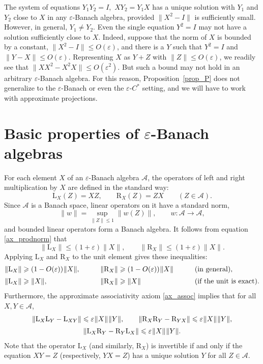 \documentclass[12pt]{article}
\newcommand{\calA}{\mathcal{A}}
\newcommand{\ts}{\mkern1mu}
\newcommand{\La}{\mathrm{L}}
\newcommand{\Ra}{\mathrm{R}}
\newcommand{\eps}{\varepsilon}
\renewcommand{\le}{\leqslant}
\renewcommand{\ge}{\geqslant}
\newtheorem[definition]{Definition}[Theorem]{Definition}
\newtheorem[remark]{Example}[Theorem]{Example}
\newtheorem[remark]{Remark}[Theorem]{Remark}
\newtheorem[remark]{Question}[Theorem]{Open question}
\newtheorem*[definition]{definition}{Definition}
\newtheorem*[remark]{example}{Example}
\newtheorem*[remark]{remark}{Remark}
\newtheorem*[remark]{question}{Open question}
\numberwithin{equation}{section}
\begin{document}
\begin{Remark}\label{rem_X2}
The system of equations $Y_1Y_2=I$,\, $XY_2=Y_1X$ has a unique solution with $Y_1$ and $Y_2$ close to $X$ in any $\eps$-Banach algebra, provided $\|X^2-I\|$ is sufficiently small. However, in general, $Y_1\not=Y_2$. Even the single equation $Y^2=I$ may not have a solution sufficiently close to $X$. Indeed, suppose that the norm of $X$ is bounded by a constant, $\|X^2-I\|\le O(\eps)$, and there is a $Y$ such that $Y^2=I$ and $\|Y-X\|\le O(\eps)$. Representing $X$ as $Y+Z$ with $\|Z\|\le O(\eps)$, we readily see that $\|XX^2-X^2X\|\le O(\eps^2)$. But such a bound may not hold in an arbitrary $\eps$-Banach algebra. For this reason, Proposition~\ref{prop_P} does not generalize to the $\eps$-Banach or even the $\eps$-$C^*$ setting, and we will have to work with approximate projections.
\end{Remark}

\section{Basic properties of \texorpdfstring{$\eps$}{epsilon}-Banach algebras}

For each element $X$ of an $\eps$-Banach algebra $\calA$, the operators of left and right multiplication by $X$ are defined in the standard way:
\begin{equation}
\La_X(Z)=XZ,\qquad \Ra_X(Z)=ZX\qquad (Z\in\calA).
\end{equation}
Since $\calA$ is a Banach space, linear operators on it have a standard norm,
\begin{equation}
\|w\|=\sup_{\|Z\|\le 1}\|w(Z)\|,\qquad w\colon \calA\to\calA,
\end{equation}
and bounded linear operators form a Banach algebra. It follows from equation \eqref{ax_prodnorm} that
\begin{equation}
\|\La_X\|\le (1+\eps)\|X\|,\qquad \|\Ra_X\|\le (1+\eps)\|X\|.
\end{equation}
Applying $\La_X$ and $\Ra_X$ to the unit element gives these inequalities:
\begin{alignat}{3}
\|\La_X\|&\ge (1-O(\eps))\ts\|X\|,\qquad
&\|\Ra_X\|&\ge (1-O(\eps))\ts\|X\|\qquad &
&(\text{in general}),\\[2pt]
\|\La_X\|&\ge \|X\|,\qquad
&\|\Ra_X\|&\ge \|X\|\qquad &
&(\text{if the unit is exact}).
\end{alignat}
Furthermore, the approximate associativity axiom \eqref{ax_assoc} implies that for all $X,Y\in\calA$,
\begin{gather}
\|\La_X\La_Y-\La_{XY}\|\le \eps\ts\|X\|\ts\|Y\|,\qquad
\|\Ra_X\Ra_Y-\Ra_{YX}\|\le \eps\ts\|X\|\ts\|Y\|,\\[2pt]
\|\La_X\Ra_Y-\Ra_Y\La_X\|\le \eps\ts\|X\|\ts\|Y\|.
\end{gather}
Note that the operator $\La_X$ (and similarly, $\Ra_X$) is invertible if and only if the equation $XY=Z$ (respectively, $YX=Z$) has a unique solution $Y$ for all $Z\in\calA$.
\end{document}
